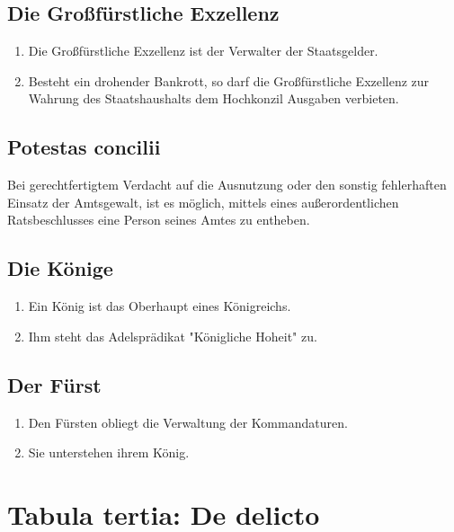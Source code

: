\documentclass{article}
\begin{document}
\subsection{Die Großfürstliche Exzellenz}
\begin{enumerate}[(1)]
    \item Die Großfürstliche Exzellenz ist der Verwalter der Staatsgelder.
    \item Besteht ein drohender Bankrott, so darf die Großfürstliche Exzellenz zur Wahrung des Staatshaushalts dem Hochkonzil Ausgaben verbieten.
\end{enumerate}

\subsection{Potestas concilii}
Bei gerechtfertigtem Verdacht auf die Ausnutzung oder den sonstig fehlerhaften Einsatz der Amtsgewalt, ist es möglich, mittels eines außerordentlichen Ratsbeschlusses eine Person seines Amtes zu entheben.

\subsection{Die Könige}
\begin{enumerate}[(1)]
    \item Ein König ist das Oberhaupt eines Königreichs.
    \item Ihm steht das Adelsprädikat "Königliche Hoheit" zu.
\end{enumerate}

\subsection{Der Fürst}
\begin{enumerate}[(1)]
    \item Den Fürsten obliegt die Verwaltung der Kommandaturen.
    \item Sie unterstehen ihrem König.
\end{enumerate}

\section{Tabula tertia: De delicto}
\end{document}
